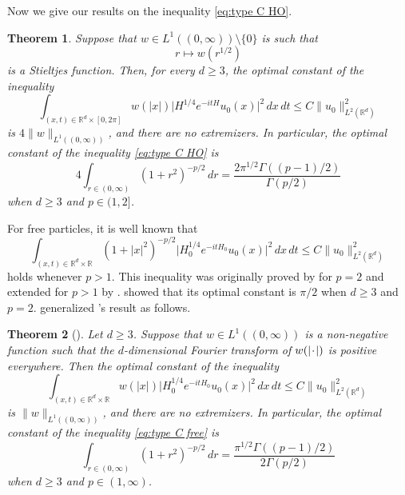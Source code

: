 \documentclass[reqno]{amsart}
\theoremstyle{plain}
\newtheorem{theorem}{Theorem}[section]
\numberwithin{equation}{section}
\theoremstyle{remark}
\newcommand*{\variabledot}{\makebox[1ex]{\textbf{$\cdot$}}}
\newcommand{\R}{\mathbb{R}}
\newcommand{\intervaloo}[2]{(#1, #2)}
\newcommand{\intervaloc}[2]{(#1, #2]}
\newcommand{\intervalcc}[2]{[#1, #2]}
\newcommand{\abs}[1]{\lvert#1\rvert}
\newcommand{\norm}[1]{\lVert#1\rVert}
\newcommand{\Hamiltonian}{H}
\newcommand{\Hamiltonianfree}{\Hamiltonian_0}
\begin{document}
Now we give our results on the inequality \eqref{eq:type C HO}.
\begin{theorem} \label{main thm:type C HO general}
	Suppose that $w \in L^1(\intervaloo{0}{\infty}) \setminus \{0\}$ is such that
	\begin{equation}
	r \longmapsto w(r^{1/2})
	\end{equation}
	is a Stieltjes function.
	Then, for every $d \geq 3$, the optimal constant of the inequality
	\begin{equation} \label{eq:type C HO general}
		\int_{(x, t) \in \R^d \times \intervalcc{0}{2\pi}} w(\abs{x}) \abs{ \Hamiltonian^{1/4} e^{- i t \Hamiltonian} u_0(x) }^2 \, dx \, dt \leq C \norm{ u_0 }_{L^2(\R^d)}^2 
	\end{equation}
	is $4 \norm{w}_{L^1(\intervaloo{0}{\infty})}$, and there are no extremizers.
	In particular, the optimal constant of the inequality \eqref{eq:type C HO} is
	\begin{equation}
		4 \int_{r \in \intervaloo{0}{\infty}} (1 + r^2)^{-p/2} \, dr = \frac{2 \pi^{1/2} \Gamma( (p-1)/2 ) }{ \Gamma(p/2) } 
	\end{equation}
	when $d \geq 3$ and $p \in \intervaloc{1}{2}$.
\end{theorem}
For free particles, it is well known that
\begin{equation} \label{eq:type C free}
	\int_{(x, t) \in \R^d \times \R} (1 + \abs{x}^2)^{-p/2} \abs{ \Hamiltonianfree^{1/4} e^{- i t \Hamiltonianfree} u_0(x) }^2 \, dx \, dt \leq C \norm{ u_0 }_{L^2(\R^d)}^2 
\end{equation}
holds whenever $p>1$.
This inequality was originally proved by \citet[Theorem 2]{KY1989} for $p=2$ and extended for $p>1$ by \citet[Theorem 1]{BK1992}.
\citet[(2)]{Sim1992} showed that its optimal constant is $\pi / 2$ when $d \geq 3$ and $p=2$.
\citet*{BSS2015} generalized \citeauthor{Sim1992}'s result as follows.
\begin{theorem}[{\cite[Theorem 1.4]{BSS2015}}] \label{thm:type C free general}
		Let $d \geq 3$. Suppose that $w \in L^1(\intervaloo{0}{\infty})$ is a non-negative function such that the $d$-dimensional Fourier transform of $w(\abs{\variabledot})$ is positive everywhere. 
	Then the optimal constant of the inequality
\begin{equation} \label{eq:type C free generalized}
	\int_{(x, t) \in \R^d \times \R} w(\abs{x}) \abs{ \Hamiltonianfree^{1/4} e^{- i t \Hamiltonianfree} u_0(x) }^2 \, dx \, dt \leq C \norm{ u_0 }_{L^2(\R^d)}^2 
\end{equation}
	is $\norm{w}_{L^1(\intervaloo{0}{\infty})}$, and there are no extremizers.
	In particular, the optimal constant of the inequality \eqref{eq:type C free} is
	\begin{equation}
		\int_{r \in \intervaloo{0}{\infty}} (1 + r^2)^{-p/2} \, dr = \frac{\pi^{1/2} \Gamma( (p-1)/2 ) }{ 2 \Gamma(p/2) } 
	\end{equation}
	when $d \geq 3$ and $p \in \intervaloo{1}{\infty}$.
\end{theorem}
\end{document}

